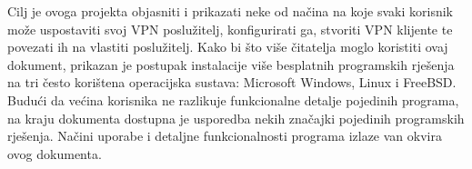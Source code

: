 \hfill \smallbreak
Cilj je ovoga projekta objasniti i prikazati neke od načina na koje svaki korisnik može uspostaviti svoj VPN poslužitelj, konfigurirati ga, stvoriti VPN klijente te povezati ih na vlastiti poslužitelj. Kako bi što više čitatelja moglo koristiti ovaj dokument, prikazan je postupak instalacije više besplatnih programskih rješenja na tri često korištena operacijska sustava: Microsoft Windows, Linux i FreeBSD. Budući da većina korisnika ne razlikuje funkcionalne detalje pojedinih programa, na kraju dokumenta dostupna je usporedba nekih značajki pojedinih programskih rješenja.\smallbreak
Načini uporabe i detaljne funkcionalnosti programa izlaze van okvira ovog dokumenta.
\bigbreak